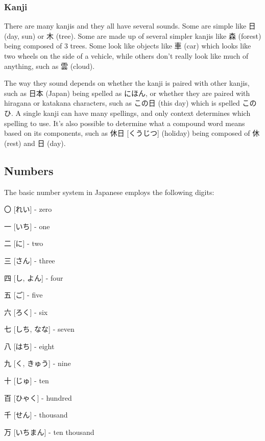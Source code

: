 \documentclass{article}
\begin{document}
\begin{CJK}{UTF8}{min}
\begin{multicols*}{3}
\subsubsection{Kanji}

There are many kanjis and they all have several sounds. Some are simple like 日 (day, sun) or 木 (tree). Some are made up of several simpler kanjis like 森 (forest) being composed of 
3 trees. Some look like objects like 車 (car) which looks like two wheels on the side of a vehicle, while others don't really look like much of anything, such as 雲 (cloud).

The way they sound depends on whether the kanji is paired with other kanjis, such as 日本 (Japan) being spelled as にほん, or whether they are paired with hiragana or katakana 
characters, such as この日 (this day) which is spelled このひ. A single kanji can have many spellings, and only context determines which spelling to use. It's also possible to 
determine what a compound word means based on its components, such as 休日 [くうじつ] (holiday) being composed of 休 (rest) and 日 (day).

\subsection{Numbers}

The basic number system in Japanese employs the following digits:

\begin{colorize}
\item 〇 [れい] - zero
\item 一 [いち] - one
\item 二 [に] - two
\item 三 [さん] - three
\item 四 [し, よん] - four
\item 五 [ご] - five
\item 六 [ろく] - six
\item 七 [しち, なな] - seven
\item 八 [はち] - eight
\item 九 [く, きゅう] - nine
\item 十 [じゅ] - ten
\item 百 [ひゃく] - hundred
\item 千 [せん] - thousand
\item 万 [いちまん] - ten thousand
\end{colorize}


\end{multicols*}
\end{CJK}
\end{document}
